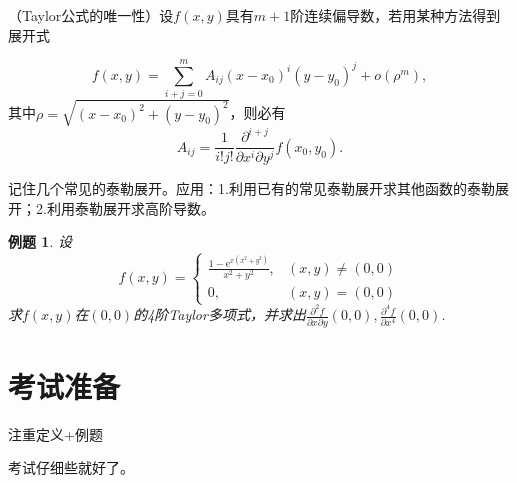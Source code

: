 \documentclass[UTF8]{ctexart}
\newtheorem{example}{例题}
\begin{document}
（Taylor公式的唯一性）设$f(x,y)$具有$m+1$阶连续偏导数，若用某种方法得到展开式

$$f(x, y)=\sum_{i+j=0}^{m} A_{i j}\left(x-x_{0}\right)^{i}\left(y-y_{0}\right)^{j}+o\left(\rho^{m}\right),$$
其中$\rho=\sqrt{\left(x-x_{0}\right)^{2}+\left(y-y_{0}\right)^{2}}$，则必有
$$A_{i j}=\frac{1}{i ! j !} \frac{\partial^{i+j}}{\partial x^{i} \partial y^{j}} f\left(x_{0}, y_{0}\right).$$

记住几个常见的泰勒展开。应用：1.利用已有的常见泰勒展开求其他函数的泰勒展开；2.利用泰勒展开求高阶导数。

\begin{example}
设
$$f(x, y)=\left\{\begin{array}{ll}
\frac{1-\mathrm{e}^{x\left(x^{2}+y^{2}\right)}}{x^{2}+y^{2}}, & (x, y) \neq(0,0) \\
0, & (x, y)=(0,0)
\end{array}\right.$$
求$f(x,y)$在$(0,0)$的4阶Taylor多项式，并求出$\frac{\partial^{2} f}{\partial x \partial y}(0,0), \frac{\partial^{4} f}{\partial x^{4}}(0,0)$.
\end{example}

\section{考试准备}
注重定义+例题

考试仔细些就好了。
\end{document}
